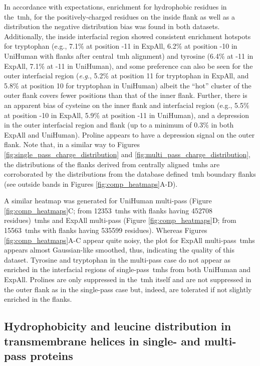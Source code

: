 In accordance with expectations, enrichment for hydrophobic residues in the~\gls{tmh}, for the positively\--charged residues on the inside flank as well as a distribution the negative distribution bias was found in both datasets.
Additionally, the inside interfacial region showed consistent enrichment hotspots for tryptophan (e.g., 7.1\% at position -11 in ExpAll, 6.2\% at position -10 in UniHuman with flanks after central~\gls{tmh} alignment) and tyrosine (6.4\% at -11 in ExpAll, 7.1\% at -11 in UniHuman), and some preference can also be seen for the outer interfacial region (\textit{e.g.}, 5.2\% at position 11 for tryptophan in ExpAll, and 5.8\% at position 10 for tryptophan in UniHuman) albeit the ``hot'' cluster of the outer flank covers fewer positions than that of the inner flank.
Further, there is an apparent bias of cysteine on the inner flank and interfacial region (e.g., 5.5\% at position -10 in ExpAll, 5.9\% at position -11 in UniHuman), and a depression in the outer interfacial region and flank (up to a minimum of 0.3\% in both ExpAll and UniHuman).
Proline appears to have a depression signal on the outer flank.
Note that, in a similar way to Figures \ref{fig:single_pass_charge_distribution} and \ref{fig:multi_pass_charge_distribution}, the distributions of the flanks derived from centrally aligned~\gls{tmh}s are corroborated by the distributions from the database defined~\gls{tmh} boundary flanks (see outside bands in Figures \ref{fig:comp_heatmaps}A-D).

A similar heatmap was generated for UniHuman multi\--pass (Figure \ref{fig:comp_heatmaps}C; from 12353~\gls{tmh}s with flanks having 452708 residues)~\gls{tmh}s and ExpAll multi\--pass (Figure \ref{fig:comp_heatmaps}D; from 15563~\gls{tmh}s with flanks having 535599 residues).
Whereas Figures \ref{fig:comp_heatmaps}A-C appear quite noisy, the plot for ExpAll multi\--pass~\gls{tmh}s appears almost Gaussian-like smoothed, thus, indicating the quality of this dataset.
Tyrosine and tryptophan in the multi\--pass case do not appear as enriched in the interfacial regions of single\--pass~\gls{tmh}s from both UniHuman and ExpAll.
Prolines are only suppressed in the~\gls{tmh} itself and are not suppressed in the outer flank as in the single\--pass case but, indeed, are tolerated if not slightly enriched in the flanks.

\subsection{Hydrophobicity and leucine distribution in transmembrane helices in single- and multi\--pass proteins}

